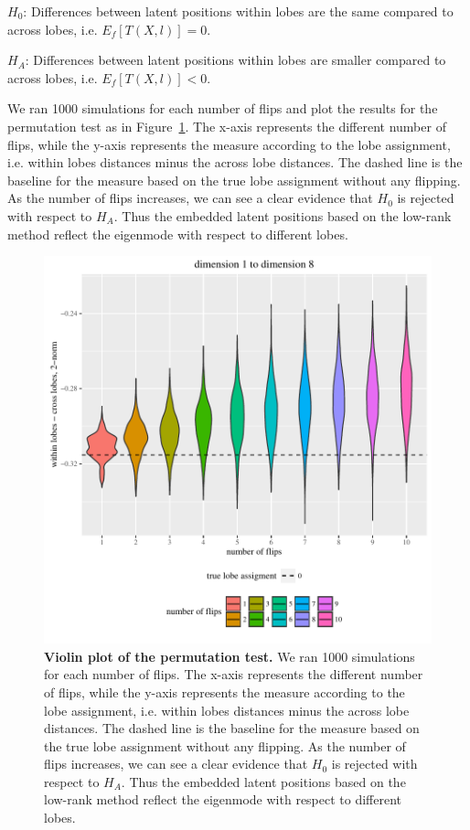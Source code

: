 \documentclass[simplex.tex]{subfiles}
\begin{document}
$H_0$: Differences between latent positions within lobes are the same compared to across lobes, i.e. $E_f[T(X, l)] = 0$.

$H_A$: Differences between latent positions within lobes are smaller compared to across lobes, i.e. $E_f[T(X, l)] < 0$.

We ran 1000 simulations for each number of flips and plot the results for the permutation test as in Figure~\ref{fig:violin}. The x-axis represents the different number of flips, while the y-axis represents the measure according to the lobe assignment, i.e. within lobes distances minus the across lobe distances. The dashed line is the baseline for the measure based on the true lobe assignment without any flipping. As the number of flips increases, we can see a clear evidence that $H_0$ is rejected with respect to $H_A$. Thus the embedded latent positions based on the low-rank method reflect the eigenmode with respect to different lobes.

\begin{figure}	
\begin{cframed}
\centering
\includegraphics[height=.8\linewidth]{../../figs/violinplot_new_flip_2norm_1_8.pdf}
\caption{\textbf{Violin plot of the permutation test.} We ran 1000 simulations for each number of flips. The x-axis represents the different number of flips, while the y-axis represents the measure according to the lobe assignment, i.e. within lobes distances minus the across lobe distances. The dashed line is the baseline for the measure based on the true lobe assignment without any flipping. As the number of flips increases, we can see a clear evidence that $H_0$ is rejected with respect to $H_A$. Thus the embedded latent positions based on the low-rank method reflect the eigenmode with respect to different lobes.}
\label{fig:violin}
\end{cframed}
\end{figure}

%
\clearpage
\end{document}
